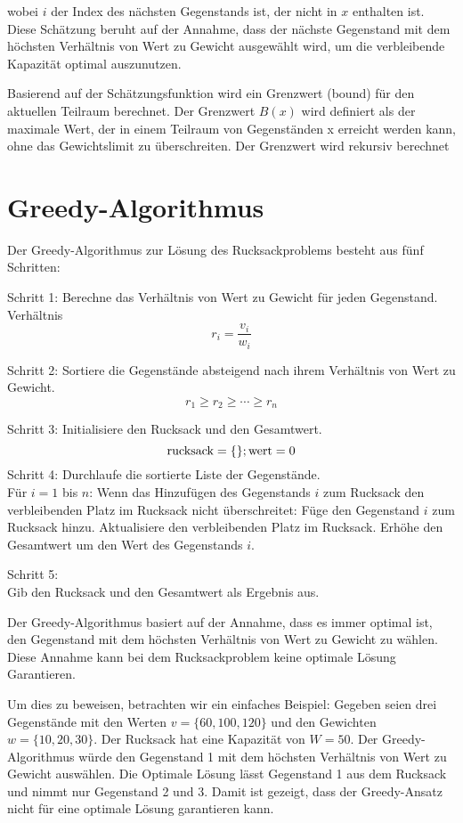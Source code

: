 wobei $i$ der Index des nächsten Gegenstands ist, der nicht 
in $x$ enthalten ist. Diese Schätzung beruht auf der Annahme, 
dass der nächste Gegenstand mit dem höchsten Verhältnis von 
Wert zu Gewicht ausgewählt wird, um die verbleibende 
Kapazität optimal auszunutzen.

Basierend auf der Schätzungsfunktion wird ein Grenzwert 
(bound) für den aktuellen Teilraum berechnet. Der Grenzwert 
$B(x)$ wird definiert als der maximale Wert, der in einem 
Teilraum von Gegenständen x erreicht werden kann, ohne das 
Gewichtslimit zu überschreiten. Der Grenzwert wird rekursiv 
berechnet

\section{Greedy-Algorithmus}
Der Greedy-Algorithmus zur Lösung des Rucksackproblems besteht 
aus fünf Schritten:

Schritt 1: Berechne das Verhältnis von Wert zu Gewicht für 
jeden Gegenstand.
Verhältnis \[r_i = \frac{v_i}{w_i}\]

Schritt 2: Sortiere die Gegenstände absteigend nach ihrem 
Verhältnis von Wert zu Gewicht.
\[r_1 \geq r_2 \geq \cdots \geq r_n\]

Schritt 3: Initialisiere den Rucksack und den Gesamtwert.
\[   \text{rucksack} = \{\}; \\
    \text{wert} = 0 \]
Schritt 4: Durchlaufe die sortierte Liste der Gegenstände.\\
Für $i = 1$ bis $n$: 
Wenn das Hinzufügen des Gegenstands $i$ zum Rucksack den 
verbleibenden Platz im Rucksack nicht überschreitet:
Füge den Gegenstand $i$ zum Rucksack hinzu.
Aktualisiere den verbleibenden Platz im Rucksack.
Erhöhe den Gesamtwert um den Wert des Gegenstands $i$.

Schritt 5: \\Gib den Rucksack und den Gesamtwert als Ergebnis 
aus.

Der Greedy-Algorithmus basiert auf der Annahme, dass es 
immer optimal ist, den Gegenstand mit dem höchsten Verhältnis 
von Wert zu Gewicht zu wählen. Diese Annahme kann bei dem Rucksackproblem
keine optimale Lösung Garantieren.

Um dies zu beweisen, betrachten wir ein einfaches Beispiel: 
Gegeben seien drei Gegenstände mit den Werten $v = \{60, 100, 120\}$ 
und den Gewichten $w =\{10, 20, 30\}$. Der Rucksack hat eine Kapazität 
von $W = 50$. Der Greedy-Algorithmus würde den Gegenstand 1 mit 
dem höchsten Verhältnis von Wert zu Gewicht auswählen. Die Optimale 
Lösung lässt Gegenstand 1 aus dem Rucksack und nimmt nur Gegenstand 2 und 3.
Damit ist gezeigt, dass der Greedy-Ansatz nicht für eine optimale Lösung 
garantieren kann.

